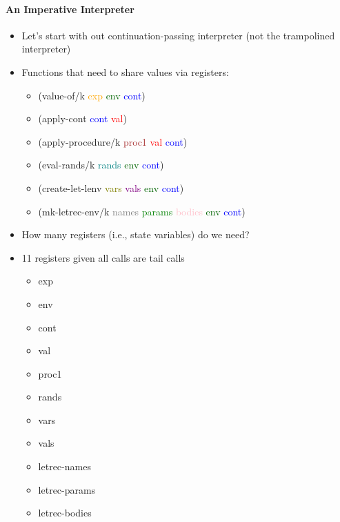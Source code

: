 \documentclass{beamer}
\begin{document}
\begin{frame}[fragile]
\framesubtitle{An Imperative Interpreter}
\begin{scriptsize}
\begin{itemize}
\item<1-> Let's start with out continuation-passing interpreter (not the trampolined interpreter)
    
\item<1-> Functions that need to share values via registers:
\begin{itemize}
\item (value-of/k \textcolor{orange}{exp} \textcolor{darkgreen}{env} \textcolor{blue}{cont})
\item (apply-cont \textcolor{blue}{cont} \textcolor{red}{val})
\item (apply-procedure/k \textcolor{brown}{proc1} \textcolor{red}{val} \textcolor{blue}{cont})
\item (eval-rands/k \textcolor{teal}{rands} \textcolor{darkgreen}{env} \textcolor{blue}{cont})
\item (create-let-lenv \textcolor{olive}{vars} \textcolor{purple}{vals} \textcolor{darkgreen}{env} \textcolor{blue}{cont})
\item (mk-letrec-env/k \textcolor{gray}{names} \textcolor{green}{params} \textcolor{pink}{bodies} \textcolor{darkgreen}{env} \textcolor{blue}{cont})
\end{itemize}

\item<1-> How many registers (i.e., state variables) do we need?

\item<2-> 11 registers given all calls are tail calls
\begin{itemize}
\item exp
\item env
\item cont
\item val
\item proc1
\item rands
\item vars
\item vals
\item letrec-names
\item letrec-params
\item letrec-bodies
\end{itemize}


\end{itemize}
\end{scriptsize}
\end{frame}
\end{document}
